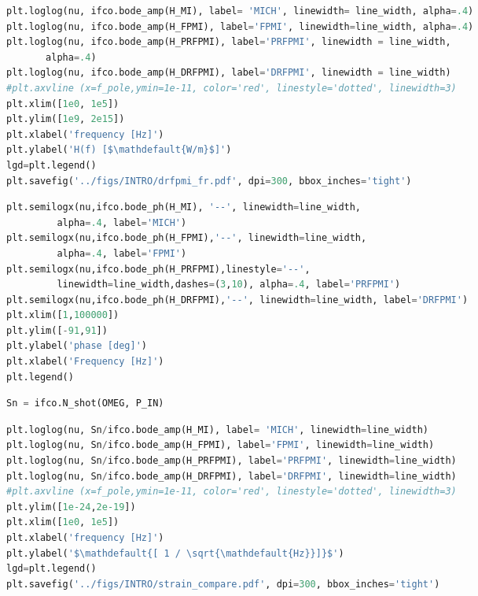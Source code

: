 \begin{spacing}{1.2}\begin{lstlisting}[frame=single, language=Python]
plt.loglog(nu, ifco.bode_amp(H_MI), label= 'MICH', linewidth= line_width, alpha=.4)
plt.loglog(nu, ifco.bode_amp(H_FPMI), label='FPMI', linewidth=line_width, alpha=.4)
plt.loglog(nu, ifco.bode_amp(H_PRFPMI), label='PRFPMI', linewidth = line_width, 
	   alpha=.4)
plt.loglog(nu, ifco.bode_amp(H_DRFPMI), label='DRFPMI', linewidth = line_width)
#plt.axvline (x=f_pole,ymin=1e-11, color='red', linestyle='dotted', linewidth=3)
plt.xlim([1e0, 1e5])
plt.ylim([1e9, 2e15])
plt.xlabel('frequency [Hz]')
plt.ylabel('H(f) [$\mathdefault{W/m}$]')
lgd=plt.legend()
plt.savefig('../figs/INTRO/drfpmi_fr.pdf', dpi=300, bbox_inches='tight')
\end{lstlisting}\end{spacing}

\begin{spacing}{1.2}\begin{lstlisting}[frame=single, language=Python]
plt.semilogx(nu,ifco.bode_ph(H_MI), '--', linewidth=line_width, 
	     alpha=.4, label='MICH')
plt.semilogx(nu,ifco.bode_ph(H_FPMI),'--', linewidth=line_width, 
	     alpha=.4, label='FPMI')
plt.semilogx(nu,ifco.bode_ph(H_PRFPMI),linestyle='--', 
	     linewidth=line_width,dashes=(3,10), alpha=.4, label='PRFPMI')
plt.semilogx(nu,ifco.bode_ph(H_DRFPMI),'--', linewidth=line_width, label='DRFPMI')
plt.xlim([1,100000])
plt.ylim([-91,91])
plt.ylabel('phase [deg]')
plt.xlabel('Frequency [Hz]')
plt.legend()
\end{lstlisting}\end{spacing}

\begin{spacing}{1.2}\begin{lstlisting}[frame=single, language=Python]
Sn = ifco.N_shot(OMEG, P_IN)
\end{lstlisting}\end{spacing}

\begin{spacing}{1.2}\begin{lstlisting}[frame=single, language=Python]
plt.loglog(nu, Sn/ifco.bode_amp(H_MI), label= 'MICH', linewidth=line_width)
plt.loglog(nu, Sn/ifco.bode_amp(H_FPMI), label='FPMI', linewidth=line_width)
plt.loglog(nu, Sn/ifco.bode_amp(H_PRFPMI), label='PRFPMI', linewidth=line_width)
plt.loglog(nu, Sn/ifco.bode_amp(H_DRFPMI), label='DRFPMI', linewidth=line_width)
#plt.axvline (x=f_pole,ymin=1e-11, color='red', linestyle='dotted', linewidth=3)
plt.ylim([1e-24,2e-19])
plt.xlim([1e0, 1e5])
plt.xlabel('frequency [Hz]')
plt.ylabel('$\mathdefault{[ 1 / \sqrt{\mathdefault{Hz}}]}$')
lgd=plt.legend()
plt.savefig('../figs/INTRO/strain_compare.pdf', dpi=300, bbox_inches='tight')
\end{lstlisting}\end{spacing}

